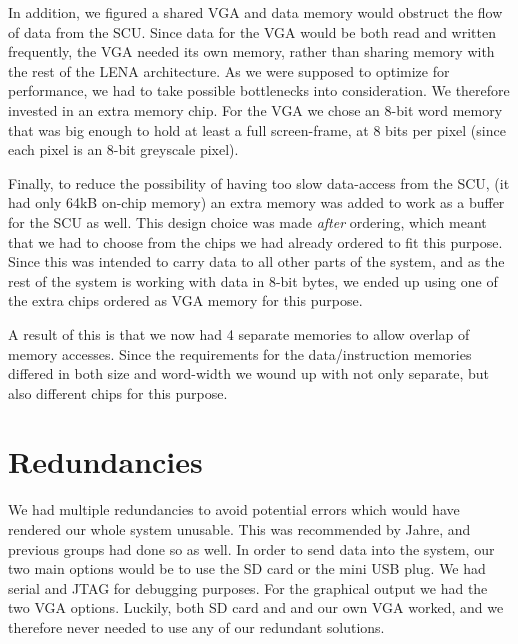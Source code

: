 In addition, we figured a shared \ac{VGA} and data memory would obstruct the
flow of data from the \ac{SCU}. Since data for the \ac{VGA} would be both read
and written frequently, the \ac{VGA} needed its own memory, rather than sharing
memory with the rest of the LENA architecture. As we were supposed to optimize
for performance, we had to take possible bottlenecks into consideration. We
therefore invested in an extra memory chip. For the VGA we chose an 8-bit word
memory that was big enough to hold at least a full screen-frame, at 8 bits per
pixel (since each pixel is an 8-bit greyscale pixel).

Finally, to reduce the possibility of having too slow data-access from the SCU,
(it had only 64kB on-chip memory) an extra memory was added to work as a buffer
for the SCU as well. This design choice was made {\em after} ordering, which
meant that we had to choose from the chips we had already ordered to fit this
purpose. Since this was intended to carry data to all other parts of the system,
and as the rest of the system is working with data in 8-bit bytes, we ended up
using one of the extra chips ordered as \ac{VGA} memory for this purpose.

A result of this is that we now had 4 separate memories to allow overlap of
memory accesses. Since the requirements for the data/instruction memories
differed in both size and word-width we wound up with not only separate, but
also different chips for this purpose.

\section{Redundancies}
We had multiple redundancies to avoid potential errors which would have rendered
our whole system unusable. This was recommended by Jahre, and previous groups
had done so as well. In order to send data into the system, our two main options
would be to use the \ac{SD} card or the mini \ac{USB} plug. We had serial and
\ac{JTAG} for debugging purposes. For the graphical output we had the two
\ac{VGA} options. Luckily, both \ac{SD} card and and our own \ac{VGA} worked,
and we therefore never needed to use any of our redundant solutions.
